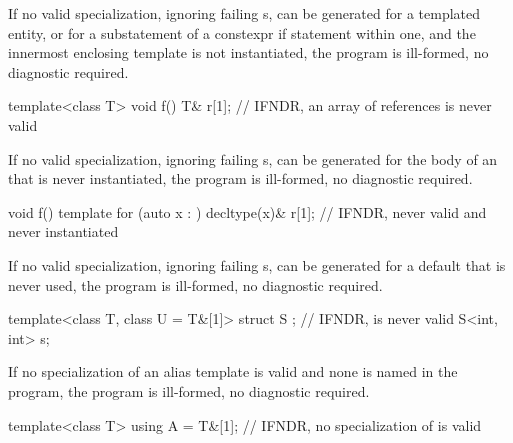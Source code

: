 
\pnum
If no valid specialization,
ignoring failing s,
can be generated for a templated entity,
or for a substatement of a constexpr if statement within one,
and the innermost enclosing template is not instantiated,
the program is ill-formed, no diagnostic required.

\pnum
\begin{example}
\begin{codeblock}
template<class T> void f() {
  T& r[1];      // IFNDR, an array of references is never valid
}
\end{codeblock}
\end{example}


\pnum
If no valid specialization,
ignoring failing s,
can be generated
for the body of an 
that is never instantiated,
the program is ill-formed, no diagnostic required.

\pnum
\begin{example}
\begin{codeblock}
void f() {
  template for (auto x : {}) {
    decltype(x)& r[1];  // IFNDR, never valid and never instantiated
  }
}
\end{codeblock}
\end{example}


\pnum
If no valid specialization,
ignoring failing s,
can be generated
for a default 
that is never used,
the program is ill-formed, no diagnostic required.

\pnum
\begin{example}
\begin{codeblock}
template<class T, class U = T&[1]> struct S {};     // IFNDR,  is never valid
S<int, int> s;
\end{codeblock}
\end{example}


\pnum
If no specialization of an alias template is valid
and none is named in the program,
the program is ill-formed, no diagnostic required.

\pnum
\begin{example}
\begin{codeblock}
template<class T> using A = T&[1];  // IFNDR, no specialization of  is valid
\end{codeblock}
\end{example}

